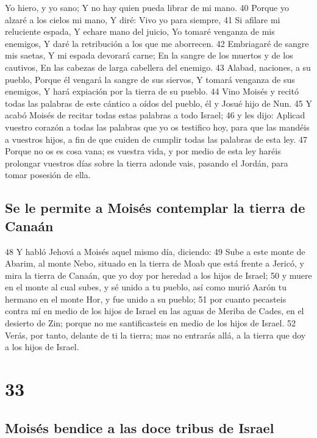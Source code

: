 Yo hiero, y yo sano;
Y no hay quien pueda librar de mi mano.
40 Porque yo alzaré a los cielos mi mano,
Y diré: Vivo yo para siempre,
41 Si afilare mi reluciente espada,
Y echare mano del juicio,
Yo tomaré venganza de mis enemigos,
Y daré la retribución a los que me aborrecen. 
42 Embriagaré de sangre mis saetas,
Y mi espada devorará carne;
En la sangre de los muertos y de los cautivos,
En las cabezas de larga cabellera del enemigo.
43 Alabad, naciones, a su pueblo, 
Porque él vengará la sangre de sus siervos, 
Y tomará venganza de sus enemigos,
Y hará expiación por la tierra de su pueblo.
44 Vino Moisés y recitó todas las palabras de este cántico a oídos del pueblo, él y Josué hijo de Nun.
45 Y acabó Moisés de recitar todas estas palabras a todo Israel;
46 y les dijo: Aplicad vuestro corazón a todas las palabras que yo os testifico hoy, para que las mandéis a vuestros hijos, a fin de que cuiden de cumplir todas las palabras de esta ley.
47 Porque no os es cosa vana; es vuestra vida, y por medio de esta ley haréis prolongar vuestros días sobre la tierra adonde vais, pasando el Jordán, para tomar posesión de ella.

\section*{Se le permite a Moisés contemplar la tierra de Canaán}
48 Y habló Jehová a Moisés aquel mismo día, diciendo:
49 Sube a este monte de Abarim, al monte Nebo, situado en la tierra de Moab que está frente a Jericó, y mira la tierra de Canaán, que yo doy por heredad a los hijos de Israel;
50 y muere en el monte al cual subes, y sé unido a tu pueblo, así como murió Aarón tu hermano en el monte Hor, y fue unido a su pueblo;
51 por cuanto pecasteis contra mí en medio de los hijos de Israel en las aguas de Meriba de Cades, en el desierto de Zin; porque no me santificasteis en medio de los hijos de Israel.
52 Verás, por tanto, delante de ti la tierra; mas no entrarás allá, a la tierra que doy a los hijos de Israel.

\chapter{33}

\section*{Moisés bendice a las doce tribus de Israel}


